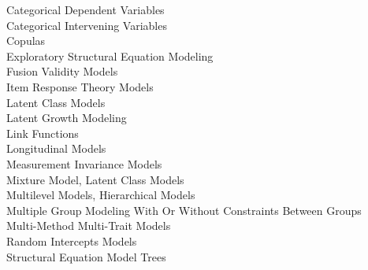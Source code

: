 Categorical Dependent Variables \\
Categorical Intervening Variables \\
Copulas \\
Exploratory Structural Equation Modeling \\
Fusion Validity Models \\
Item Response Theory Models \\
Latent Class Models \\
Latent Growth Modeling \\
Link Functions \\
Longitudinal Models \\
Measurement Invariance Models \\
Mixture Model, Latent Class Models \\
Multilevel Models, Hierarchical Models \\
Multiple Group Modeling With Or Without Constraints Between Groups \\
Multi-Method Multi-Trait Models \\
Random Intercepts Models \\
Structural Equation Model Trees \\